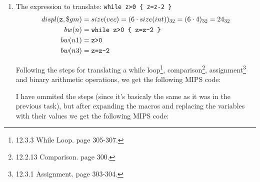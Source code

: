 \documentclass{article}
\begin{document}
\begin{enumerate}
{            And finaly, after expanding the macros and replacing the variables with their values we get the following MIPS code:

			
        }
        \pagebreak \item {
			The expression to translate: \verb|while z>0 { z=z-2 }|
            \begin{displaymath}
                \begin{aligned}
                    displ(\texttt{z}, \$gm) &= size(vec) = (6 \cdot size(int))_{32} = (6 \cdot 4)_{32} = 24_{32} \\
					bw(n) &= \verb|while z>0 { z=z-2 }| \\
					bw(n1) &= \verb|z>0| \\
					bw(n3) &= \verb|z=z-2| \\
                \end{aligned}
            \end{displaymath}

			Following the steps for translating a while loop\footnote{12.3.3 While Loop. page 305-307.}, comparison\footnote{12.2.13 Comparison. page 300.}, assignment\footnote{12.3.1 Assignment. page 303-304.} and binary arithmetic operations, we get the following MIPS code:


			I have ommited the steps (since it's basicaly the same as it was in the previous task), but after expanding the macros and replacing the variables with their values we get the following MIPS code:

			
        }
    \end{enumerate}
\end{document}
